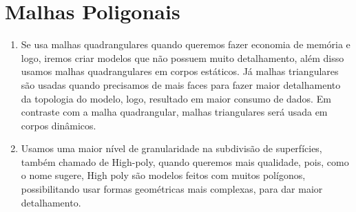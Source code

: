 \section*{Malhas Poligonais}

	\begin{enumerate}\addtocounter{enumi}{7}
	
		\item Se usa malhas quadrangulares quando queremos fazer economia de memória e 
		logo, iremos criar modelos que não possuem muito detalhamento, além disso 
		usamos malhas quadrangulares em corpos estáticos. Já malhas triangulares
		são usadas quando precisamos de mais faces para fazer maior detalhamento da topologia
		do modelo, logo, resultado em maior consumo de dados. Em contraste com a malha quadrangular,
		malhas triangulares será usada em corpos dinâmicos.
		
		\item Usamos uma maior nível de granularidade na subdivisão de superfícies, também 
		chamado de High-poly, quando queremos mais qualidade, pois, como o nome sugere, High 
		poly são modelos feitos com muitos polígonos, possibilitando usar formas geométricas mais 
		complexas, para dar maior detalhamento.
		
	\end{enumerate}